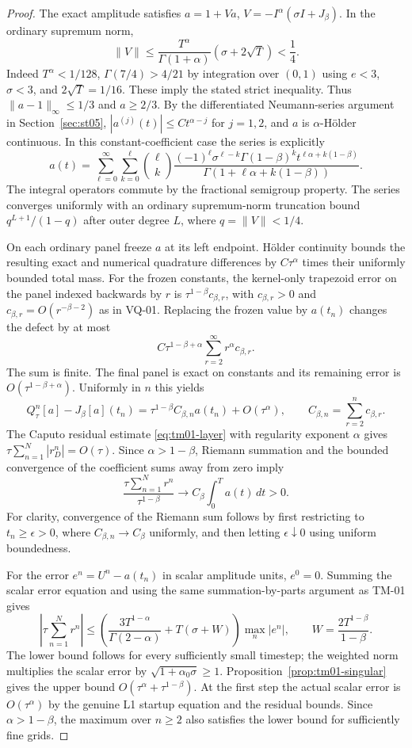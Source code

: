 \documentclass[11pt,a4paper]{amsart}
\theoremstyle{remark}
\theoremstyle{plain}
\theoremstyle{remark}
\numberwithin{equation}{section}
\begin{document}
\begin{proof}
The exact amplitude satisfies $a=1+Va$, $V=-I^\alpha(\sigma I+J_\beta)$. In the ordinary supremum norm,
\[
 \|V\|\le \frac{T^\alpha}{\Gamma(1+\alpha)}(\sigma+2\sqrt T)<\frac14.
\]
Indeed $T^\alpha<1/128$, $\Gamma(7/4)>4/21$ by integration over $(0,1)$ using $e<3$, $\sigma<3$, and $2\sqrt T=1/16$. These imply the stated strict inequality. Thus $\|a-1\|_\infty\le1/3$ and $a\ge2/3$. By the differentiated Neumann-series argument in Section~\ref{sec:st05}, $|a^{(j)}(t)|\le Ct^{\alpha-j}$ for $j=1,2$, and $a$ is $\alpha$-H\"older continuous. In this constant-coefficient case the series is explicitly
\[
 a(t)=\sum_{\ell=0}^\infty\sum_{k=0}^{\ell}
 \binom{\ell}{k}\frac{(-1)^\ell\sigma^{\ell-k}\Gamma(1-\beta)^k
 t^{\ell\alpha+k(1-\beta)}}{\Gamma(1+\ell\alpha+k(1-\beta))}.
\]
The integral operators commute by the fractional semigroup property. The series converges uniformly with an ordinary supremum-norm truncation bound $q^{L+1}/(1-q)$ after outer degree $L$, where $q=\|V\|<1/4$.

On each ordinary panel freeze $a$ at its left endpoint. H\"older continuity bounds the resulting exact and numerical quadrature differences by $C\tau^\alpha$ times their uniformly bounded total mass. For the frozen constants, the kernel-only trapezoid error on the panel indexed backwards by $r$ is $\tau^{1-\beta}c_{\beta,r}$, with $c_{\beta,r}>0$ and $c_{\beta,r}=O(r^{-\beta-2})$ as in VQ-01. Replacing the frozen value by $a(t_n)$ changes the defect by at most
\[
 C\tau^{1-\beta+\alpha}\sum_{r=2}^{\infty}r^\alpha c_{\beta,r}.
\]
The sum is finite. The final panel is exact on constants and its remaining error is $O(\tau^{1-\beta+\alpha})$. Uniformly in $n$ this yields
\[
 Q_\tau^n[a]-J_\beta[a](t_n)
 =\tau^{1-\beta}C_{\beta,n}a(t_n)+O(\tau^\alpha),
 \qquad C_{\beta,n}=\sum_{r=2}^{n}c_{\beta,r}.
\]
The Caputo residual estimate \eqref{eq:tm01-layer} with regularity exponent $\alpha$ gives $\tau\sum_{n=1}^N|r_D^n|=O(\tau)$. Since $\alpha>1-\beta$, Riemann summation and the bounded convergence of the coefficient sums away from zero imply
\[
 \frac{\tau\sum_{n=1}^N r^n}{\tau^{1-\beta}}
 \longrightarrow C_\beta\int_0^T a(t)\,dt>0.
\]
For clarity, convergence of the Riemann sum follows by first restricting to $t_n\ge\epsilon>0$, where $C_{\beta,n}\to C_\beta$ uniformly, and then letting $\epsilon\downarrow0$ using uniform boundedness.

For the error $e^n=U^n-a(t_n)$ in scalar amplitude units, $e^0=0$. Summing the scalar error equation and using the same summation-by-parts argument as TM-01 gives
\[
 \left|\tau\sum_{n=1}^N r^n\right|\le
 \left(\frac{3T^{1-\alpha}}{\Gamma(2-\alpha)}+T(\sigma+W)\right)
 \max_n|e^n|,
 \qquad W=\frac{2T^{1-\beta}}{1-\beta}.
\]
The lower bound follows for every sufficiently small timestep; the weighted norm multiplies the scalar error by $\sqrt{1+\alpha_0\sigma}\ge1$. Proposition~\ref{prop:tm01-singular} gives the upper bound $O(\tau^\alpha+\tau^{1-\beta})$. At the first step the actual scalar error is $O(\tau^\alpha)$ by the genuine L1 startup equation and the residual bounds. Since $\alpha>1-\beta$, the maximum over $n\ge2$ also satisfies the lower bound for sufficiently fine grids.
\end{proof}
\end{document}
